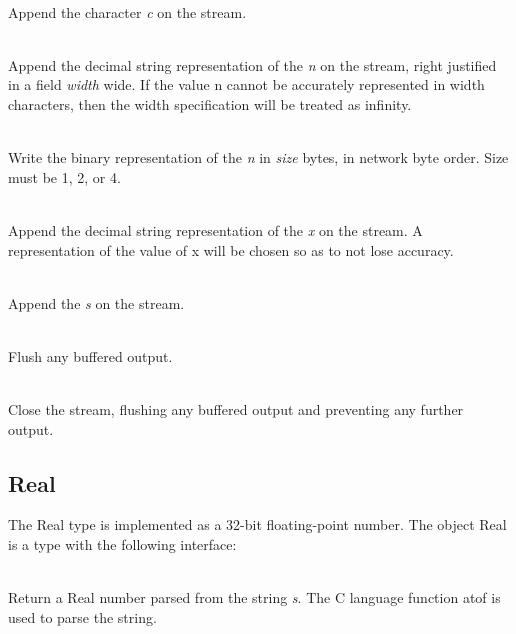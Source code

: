 \begin{desc}
  \item[\kw{operation} putChar\/\LB{}c \CO{} \tn{Character}\/\RB{}]~\\
    Append the character {\it c} on the stream.
  \item[\kw{operation} putInt\/\LB{}n \CO{} \tn{Integer}, width \CO{} \tn{Integer}\/\RB{}]~\\
    Append the decimal string representation of the  {\it n} on the
    stream, right justified in a field {\it width} wide.  If the value n
    cannot be accurately represented in width characters, then the width
    specification will be treated as infinity.
  \item[\kw{operation} writeInt\/\LB{}n \CO{} \tn{Integer}, size \CO{} \tn{Integer}\/\RB{}]~\\
    Write the binary representation of the  {\it n} in {\it
    size} bytes, in network byte order.  Size must be 1, 2, or 4.
  \item[\kw{operation} putReal\/\LB{}x \CO{} \tn{Real}\/\RB{}]~\\
    Append the decimal string representation of the  {\it x} on the
    stream.  A representation of the value of x will be chosen so as to not
    lose accuracy.
  \item[\kw{operation} putString\/\LB{}s \CO{} \tn{String}\/\RB{}]~\\
    Append the  {\it s} on the stream.
  \item[\kw{operation} flush]~\\
    Flush any buffered output.
  \item[\kw{operation} close]~\\
    Close the stream, flushing any buffered output and preventing any
    further output.
\end{desc}

\subsection{Real}
\label{builtin Real}
The Real type is implemented as a 32-bit floating-point number.
The object Real is a type with the following interface:

\begin{desc}
  \item[\kw{function} literal\/\LB{}s \CO{} \tn{String}\/\RB{} \returns{} \/\LB{}\tn{Real}\/\RB{}]~\\
    Return a Real number parsed from the string {\it s}.  The C language
    function atof is used to parse the string.
\end{desc}

